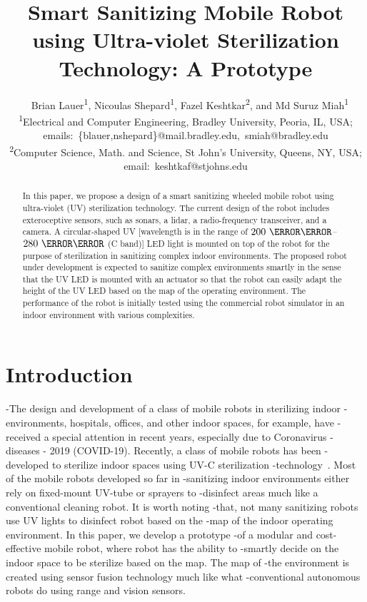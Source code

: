 \documentclass[letterpaper]{article} %
\title{Smart Sanitizing Mobile Robot using Ultra-violet Sterilization
  Technology: A Prototype}
\author{~%
Brian Lauer\textsuperscript{\rm 1}, Nicoulas Shepard\textsuperscript{\rm 1},
Fazel Keshtkar\textsuperscript{\rm 2}, and Md Suruz Miah\textsuperscript{\rm 1}
\\  
\textsuperscript{\rm 1}Electrical and Computer Engineering, Bradley University, Peoria, IL, USA; emails:~\{blauer,nshepard\}@mail.bradley.edu,~smiah@bradley.edu\\
\textsuperscript{\rm 2}Computer Science, Math. and Science, St John's University, Queens, NY, USA; email:~keshtkaf@stjohns.edu
}
\begin{document}
\maketitle

\begin{abstract}

  In this paper, we propose a design of a smart sanitizing wheeled mobile robot
  using ultra-violet (UV) sterilization technology. The current design of the
  robot includes exteroceptive sensors, such as sonars, a lidar, a radio-frequency
  transceiver, and a camera. A circular-shaped UV [wavelength is in the range of
  $200~\nano\meter$--$280~\nano\meter$ (C band)] LED light is mounted on top
  of the robot for the purpose of sterilization in sanitizing complex indoor
  environments. The proposed robot under development is expected to sanitize  
  complex environments smartly in the sense that the UV LED is mounted with an actuator so that the robot can
  easily adapt the height of the UV LED based on the map of the operating
  environment. The performance of the robot is
  initially tested using the commercial robot simulator in an indoor environment
  with various complexities.   

\end{abstract}

\section{Introduction}
\label{sec:introduction}

-The design and development of a class of mobile robots in sterilizing indoor
-environments, hospitals, offices, and other indoor spaces, for example, have
-received a special attention in recent years, especially due to Coronavirus
-diseases - 2019 (COVID-19). Recently, a class of mobile robots has been
-developed to sterilize indoor spaces using UV-C sterilization
-technology~. Most of the mobile robots developed so far in
-sanitizing indoor environments either rely on fixed-mount UV-tube or sprayers to
-disinfect areas much like a conventional cleaning robot. It is worth noting
-that, not many sanitizing robots use UV lights to disinfect robot based on the
-map of the indoor operating environment. In this paper, we develop a prototype
-of a modular and cost-effective mobile robot, where robot has the ability to
-smartly decide on the indoor space to  be sterilize based on the map. The map of
-the environment is created using sensor fusion technology much like what
-conventional autonomous robots do using range and vision sensors.
\end{document}
